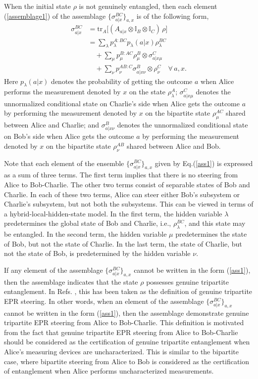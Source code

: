 \documentclass[pra,a4paper,aps,twocolumn,showpacs,superscriptaddress,groupedaddress]{revtex4}
\begin{document}
When the initial state $\rho$ is not genuinely entangled, then  each element (\ref{assemblage1}) of the assemblage $\{\sigma_{a|x}^{BC}\}_{a,x}$ is of the following form,
\begin{align}
	\sigma_{a|x}^{BC} &= \text{tr}_A \big[ (A_{a|x} \otimes \mathbb{I}_B \otimes \mathbb{I}_C) \, \rho \big] \nonumber \\
				&= \sum_{\lambda} p_{\lambda}^{A:BC}  p_{\lambda}(a|x) \rho_{\lambda}^{BC} \nonumber \\
				& \quad + \sum_{\mu}p_{\mu}^{B:AC}\rho_{\mu}^B \otimes \sigma_{a|x\mu}^C \nonumber \\
				& \quad + \sum_{\nu}p_{\nu}^{AB:C} \sigma_{a|x\nu}^B \otimes \rho_{\nu}^{C} \quad \forall \, a,x. 
				\label{ass1}
\end{align}
Here $p_{\lambda}(a|x)$ denotes the probability of getting the outcome $a$ when Alice performs the measurement denoted by $x$ on the state $\rho_{\lambda}^A$; $\sigma_{a|x\mu}^C$ denotes the unnormalized conditional state on Charlie's side when Alice gets the outcome $a$ by performing the measurement denoted by $x$ on the bipartite state $\rho_{\mu}^{AC}$ shared between Alice and Charlie; and $\sigma_{a|x\nu}^B$ denotes the unnormalized conditional state on Bob's side when Alice gets the outcome $a$ by performing the measurement denoted by $x$ on the bipartite state $\rho_{\nu}^{AB}$ shared between Alice and Bob. 

   Note that each element of the  ensemble $\{\sigma_{a|x}^{BC}\}_{a,x}$ given by Eq.(\ref{ass1}) is
expressed as a sum of three terms. The first term implies that there is
no steering from Alice to Bob-Charlie. The other two terms consist of separable states of Bob and Charlie. In each of these two terms,
Alice can steer either Bob's subsystem or Charlie's subsystem, but not both the subsystems. 
This can be viewed in terms of  a hybrid-local-hidden-state model. In the first term, the hidden variable $\lambda$ predetermines the global state of Bob and
Charlie, i.e., $\rho_{\lambda}^{BC}$, and this state may be
entangled. In the second term, the hidden variable $\mu$ predetermines the state of Bob, but not the state of Charlie. In the last term, the state of Charlie, but not the state of Bob, is predetermined by the hidden variable $\nu$. 


 If any element of the assemblage $\{\sigma_{a|x}^{BC}\}_{a,x}$ cannot be written in the form (\ref{ass1}), then the assemblage indicates that the state $\rho$ possesses genuine tripartite entanglement.  In Refs. \cite{Daniel,stm2,stm3,stm4}, this has been taken as the definition of genuine tripartite EPR steering. In other words, when an element  of the assemblage $\{\sigma_{a|x}^{BC}\}_{a,x}$ cannot be written in the form (\ref{ass1}), then the assemblage demonstrate genuine  tripartite EPR steering from Alice to Bob-Charlie. This definition is motivated from the fact that genuine tripartite EPR steering from Alice to Bob-Charlie should be considered as the certification of genuine tripartite entanglement when Alice's measuring devices are uncharacterized. This is similar to the bipartite case, where bipartite steering from Alice to Bob is considered as the certification of entanglement when Alice performs uncharacterized measurements.
\end{document}
